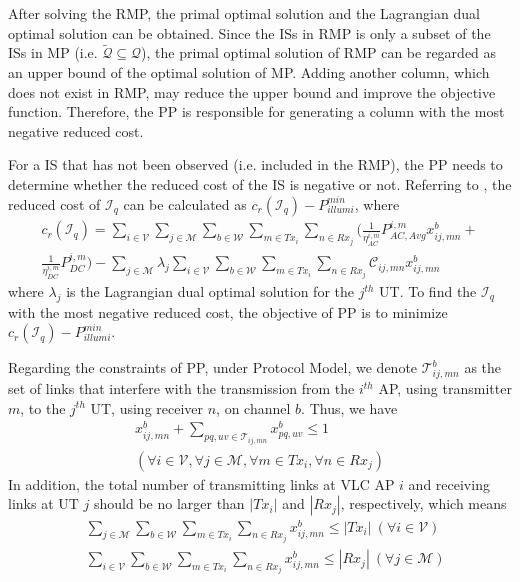 \documentclass[10pt,journal]{IEEEtran}
\begin{document}
After solving the RMP, the primal optimal solution and the Lagrangian dual optimal solution can be obtained. Since the ISs in RMP is only a subset of the ISs in MP (i.e. $\tilde{\mathcal{Q}}\subseteq\mathcal{Q}$), the primal optimal solution of RMP can be regarded as an upper bound of the optimal solution of MP. Adding another column, which does not exist in RMP, may reduce the upper bound and improve the objective function. Therefore, the PP is responsible for generating a column with the most negative reduced cost.

For a IS that has not been observed (i.e. included in the RMP), the PP needs to determine whether the reduced cost of the IS is negative or not. Referring to \cite{bertsimas1997introduction}, the reduced cost of $\mathcal{I}_{q}$ can be calculated as $c_{r}(\mathcal{I}_{q})-P_{illumi}^{min}$, where
\begin{align}
c_{r}(\mathcal{I}_{q})=\sum_{i\in\mathcal{V}}\sum_{j\in\mathcal{M}}\sum_{b\in\mathcal{W}}\sum_{m\in Tx_{i}}\sum_{n\in Rx_{j}}(\frac{1}{\eta_{AC}^{i,m}} P_{AC,Avg}^{i,m}x_{ij,mn}^{b}+\nonumber\\
\frac{1}{\eta_{DC}^{i,m}}P_{DC}^{i,m})-\sum_{j\in\mathcal{M}}\lambda_{j}\sum_{i\in\mathcal{V}}\sum_{b\in\mathcal{W}}\sum_{m\in Tx_{i}}\sum_{n\in Rx_{j}}\mathcal{C}_{ij,mn}x_{ij,mn}^{b}\nonumber
\end{align}
where $\lambda_{j}$ is the Lagrangian dual optimal solution for the $j^{th}$ UT. To find the $\mathcal{I}_{q}$ with the most negative reduced cost, the objective of PP is to minimize $c_{r}(\mathcal{I}_{q})-P_{illumi}^{min}$.

Regarding the constraints of PP, under Protocol Model, we denote $\mathcal{T}_{ij,mn}^{b}$ as the set of links that interfere with the transmission from the $i^{th}$ AP, using transmitter $m$, to the $j^{th}$ UT, using receiver $n$, on channel $b$. Thus, we have
\begin{align}
x_{ij,mn}^{b}+\sum_{pq,uv\in\mathcal{T}_{ij,mn}}x_{pq,uv}^{b}\leq 1\nonumber\\
(\forall i\in\mathcal{V}, \forall j\in\mathcal{M}, \forall m\in Tx_{i}, \forall n\in Rx_{j})
\end{align}
In addition, the total number of transmitting links at VLC AP $i$ and receiving links at UT $j$ should be no larger than $|Tx_{i}|$ and $|Rx_{j}|$, respectively, which means
\begin{align}
&\sum_{j\in\mathcal{M}}\sum_{b\in\mathcal{W}}\sum_{m\in Tx_{i}}\sum_{n\in Rx_{j}}x_{ij,mn}^{b}\leq |Tx_{i}|~(\forall i\in\mathcal{V})\\
&\sum_{i\in\mathcal{V}}\sum_{b\in\mathcal{W}}\sum_{m\in Tx_{i}}\sum_{n\in Rx_{j}}x_{ij,mn}^{b}\leq |Rx_{j}|~(\forall j\in\mathcal{M})
\end{align}
\end{document}
